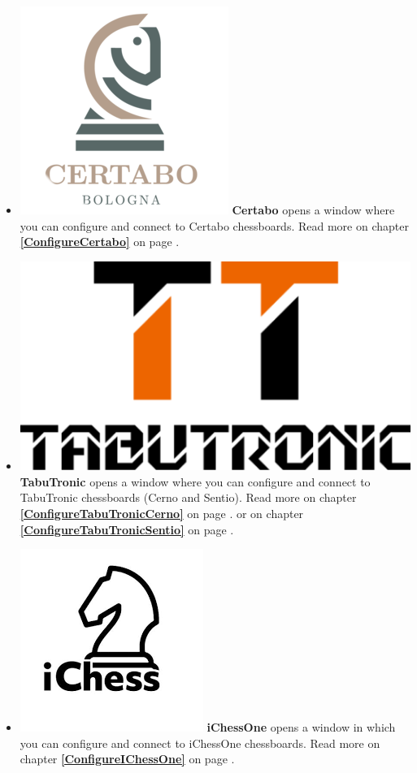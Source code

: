 \documentclass[11pt,a4paper]{article}
\begin{document}
	\begin{itemize}
		\item  \includegraphics[scale=0.1]{Certabo_icon.png} \textbf{Certabo} opens a window where you can configure and connect to Certabo chessboards.  Read more on chapter \textbf{\ref{ConfigureCertabo}  } on page \pageref{ConfigureCertabo}.
		\item  \includegraphics[scale=0.05]{tabutronic_logo_def.png} \textbf{TabuTronic} opens a window where you can configure and connect to TabuTronic chessboards (Cerno and Sentio). Read more on chapter \textbf{\ref{ConfigureTabuTronicCerno}  } on page \pageref{ConfigureTabuTronicCerno}.	or on chapter \textbf{\ref{ConfigureTabuTronicSentio}  } on page \pageref{ConfigureTabuTronicSentio}.	
		\item  \includegraphics[scale=0.1]{iChessOneIcon.png} \textbf{iChessOne} opens a window in which you can configure and connect to iChessOne chessboards.  Read more on chapter \textbf{\ref{ConfigureIChessOne}  } on page \pageref{ConfigureIChessOne}.    

\end{itemize}
\end{document}
